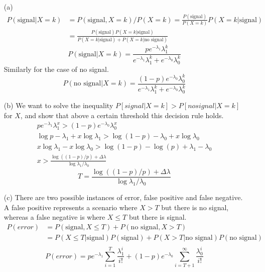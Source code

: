 \documentclass{article}
\newcommand{\sig}[0]{\text{signal}}
\newcommand{\nosig}[0]{\text{no signal}}
\begin{document}
    \begin{solution}
        \begin{enumerate}
            \item[(a)] \begin{align*}
                P(\sig | X  = k) &= P(\sig, X = k)/P(X = k) = \frac{P(\sig)}{P(X = k)} P(X = k | \sig) \\
                &= \frac{P(\sig)P(X = k | \sig)}{P(X = k | \sig) + P(X = k | \nosig)}
            \end{align*}
            \begin{equation}
                P(\sig | X  = k) = \frac{p e^{-\lambda_1} \lambda_1^k}{e^{-\lambda_1} \lambda_1^k + e^{-\lambda_0} \lambda_0^k}
            \end{equation}
            Similarly for the case of no signal.
            \begin{equation*}
                P(\nosig | X = k) = \frac{(1-p) e^{-\lambda_0} \lambda_0^k}{e^{-\lambda_1} \lambda_1^k + e^{-\lambda_0} \lambda_0^k}
            \end{equation*}
            \item[(b)] We want to solve the inequality $P[signal|X = k] > P[no signal|X = k]$ for $X$, and show that above a certain threshold this decision rule holds.
            \begin{gather*}
                p e^{-\lambda_1} \lambda_1^x > (1-p)e^{-\lambda_0} \lambda_0^x \\
                \log{p} - \lambda_1 + x \log{\lambda_1} > \log(1-p) - \lambda_0 + x\log{\lambda_0} \\
                x \log{\lambda_1} - x \log{\lambda_0} > \log(1-p) - \log(p) + \lambda_1 - \lambda_0 \\
                x > \frac{\log((1-p)/p) + \Delta\lambda} {\log{\lambda_1 / \lambda_0}}
            \end{gather*}
            \begin{equation}
                T = \frac{\log((1-p)/p) + \Delta\lambda} {\log{\lambda_1 / \lambda_0}}
            \end{equation}

            \item[(c)] There are two possible instances of error, false positive and false negative. A false positive represents a scenario where $X > T$ but there is no signal, whereas a false negative is where $X \leq T$ but there is signal.
            \begin{align*}
                P(error) &= P(\sig, X \leq T) + P(\nosig, X > T) \\
                &= P(X \leq T | \sig)P(\sig) + P(X > T | \nosig)P(\nosig) \\
            \end{align*}
            \begin{equation}
                P(error) = pe^{-\lambda_1} \sum_{i=1}^T \frac{\lambda_1^i}{i!} + (1-p)e^{-\lambda_0} \sum_{i=T+1}^{\infty} \frac{\lambda_0^i}{i!}
            \end{equation}
        \end{enumerate}
    \end{solution}

    


    
\end{document}
